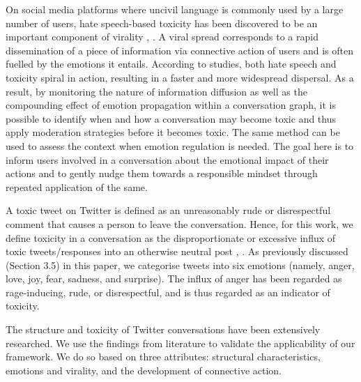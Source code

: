 \documentclass[acmtog]{acmart}
\begin{document}
On social media platforms where uncivil language is commonly used by a large number of users, hate speech-based toxicity has been discovered to be an important component of virality \cite{maarouf2022virality}, \cite{goel2016structural}. A viral spread corresponds to a rapid dissemination of a piece of information via connective action of users and is often fuelled by the emotions it entails. According to studies, both hate speech and toxicity spiral in action, resulting in a faster and more widespread dispersal. As a result, by monitoring the nature of information diffusion as well as the compounding effect of emotion propagation within a conversation graph, it is possible to identify when and how a conversation may become toxic and thus apply moderation strategies before it becomes toxic. The same method can be used to assess the context when emotion regulation is needed. The goal here is to inform users involved in a conversation about the emotional impact of their actions and to gently nudge them towards a responsible mindset through repeated application of the same.

A toxic tweet on Twitter is defined as an unreasonably rude or disrespectful comment that causes a person to leave the conversation. Hence, for this work, we define toxicity in a conversation as the disproportionate or excessive influx of toxic tweets/responses into an otherwise neutral post \cite{aroyo2019crowdsourcing}, \cite{xenos2021toxicity}. As previously discussed (Section 3.5) in this paper, we categorise tweets into six emotions (namely, anger, love, joy, fear, sadness, and surprise). The influx of anger has been regarded as rage-inducing, rude, or disrespectful, and is thus regarded as an indicator of toxicity.


The structure and toxicity of Twitter conversations have been extensively researched. We use the findings from literature to validate the applicability of our framework. We do so based on three attributes: structural characteristics, emotions and virality, and the development of connective action.
\end{document}
